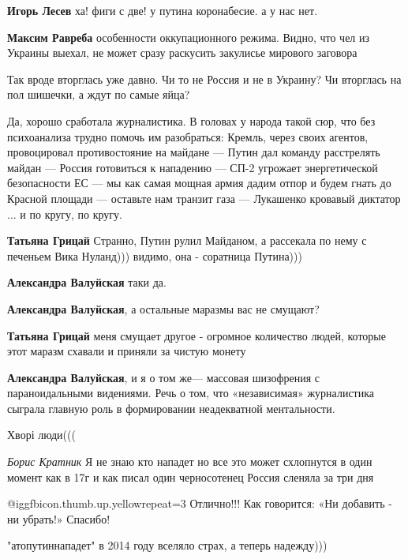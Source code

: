 \begin{itemize}
\begin{itemize}
\textbf{Игорь Лесев} ха! фиги с две! у путина коронабесие. а у нас нет.

\textbf{Максим Равреба} особенности оккупационного режима. Видно, что чел из Украины выехал, не может сразу раскусить закулисье мирового заговора
\end{itemize} %

Так вроде вторглась уже давно. Чи то не Россия и не в Украину? Чи вторглась на пол шишечки, а ждут по самые яйца?


Да, хорошо сработала журналистика. В головах у народа такой сюр, что без
психоанализа трудно помочь им разобраться: Кремль, через своих агентов,
провоцировал противостояние на майдане — Путин дал команду расстрелять майдан —
Россия готовиться к нападению — СП-2 угрожает энергетической безопасности ЕС —
мы как самая мощная армия дадим отпор и будем гнать до Красной площади —
оставьте нам транзит газа — Лукашенко кровавый диктатор ... и по кругу, по кругу.

\begin{itemize} %
\textbf{Татьяна Грицай} Странно, Путин рулил Майданом, а рассекала по нему с печеньем Вика Нуланд))) видимо, она - соратница Путина)))

\textbf{Александра Валуйская} таки да.

\textbf{Александра Валуйская}, а остальные маразмы вас не смущают?

\textbf{Татьяна Грицай} меня смущает другое - огромное количество людей, которые этот маразм схавали и приняли за чистую монету

\textbf{Александра Валуйская}, и я о том же— массовая шизофрения с параноидальными видениями.
Речь о том, что «независимая» журналистика сыграла главную роль в формировании неадекватной ментальности.

Хворі люди(((
\end{itemize} %

\emph{Борис Кратник}
Я не знаю кто нападет но все это может схлопнутся в один момент как в 17г и как писал один черносотенец Россия сленяла за три дня

 @igg{fbicon.thumb.up.yellow}{repeat=3} 
Отлично!!!
Как говорится: «Ни добавить - ни убрать!»
Спасибо!

"атопутиннападет" в 2014 году вселяло страх, а теперь надежду)))


\end{itemize}
